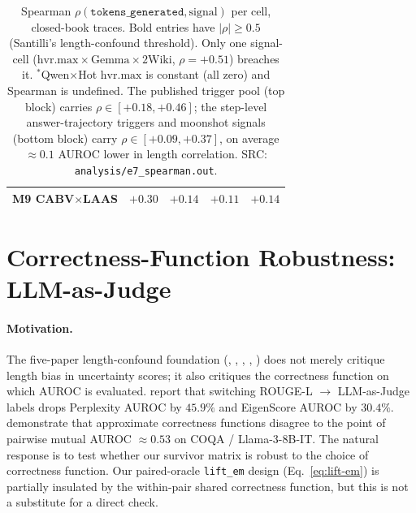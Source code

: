 \documentclass[11pt]{article}
\begin{document}
\begin{table}[h]
\begin{tabular}{@{}lrrrr@{}}
M9 CABV$\times$LAAS   & $+0.30$ & $+0.14$ & $+0.11$ & $+0.14$ \\
\bottomrule
\end{tabular}
\caption{Spearman $\rho(\texttt{tokens\_generated}, \text{signal})$ per
cell, closed-book traces. Bold entries have $|\rho|\geq 0.5$ (Santilli's
length-confound threshold). Only one signal-cell ($\mathrm{hvr.max}\times
\text{Gemma}\times\text{2Wiki}$, $\rho{=}+0.51$) breaches it. $^{*}$Qwen$\times$Hot
$\mathrm{hvr.max}$ is constant (all zero) and Spearman is undefined.
The published trigger pool (top block) carries
$\rho \in [+0.18, +0.46]$; the step-level answer-trajectory triggers and
moonshot signals (bottom block) carry $\rho \in [+0.09, +0.37]$, on average
$\approx 0.1$ AUROC lower in length correlation. SRC:
\texttt{analysis/e7\_spearman.out}.}
\label{tab:spearman}
\end{table}

\section{Correctness-Function Robustness: LLM-as-Judge}
\label{sec:appendix-containment}
\label{sec:appendix-llmjudge}

\paragraph{Motivation.} The five-paper length-confound foundation
(\citealp{Santilli_RevisitingUQEvaluationLengthBias},
\citealp{Vashurin_UncertaintyLineLengthInvariant},
\citealp{Janiak_IllusionProgressHallucinationDetection},
\citealp{Zhang_VerbosityVeracityVCBehavior},
\citealp{Ielanskyi_PitfallsUQEvaluationNLG}) does not merely critique length
bias in uncertainty scores; it also critiques the correctness function on
which AUROC is evaluated. \cite{Janiak_IllusionProgressHallucinationDetection}
report that switching ROUGE-L $\to$ LLM-as-Judge labels drops Perplexity
AUROC by $45.9\%$ and EigenScore AUROC by $30.4\%$.
\cite{Ielanskyi_PitfallsUQEvaluationNLG} demonstrate that approximate
correctness functions disagree to the point of pairwise mutual AUROC
$\approx 0.53$ on COQA / Llama-3-8B-IT. The natural response is to test
whether our survivor matrix is robust to the choice of correctness
function. Our paired-oracle \texttt{lift\_em} design
(Eq.~\ref{eq:lift-em}) is partially insulated by the within-pair shared
correctness function, but this is not a substitute for a direct check.
\end{document}
